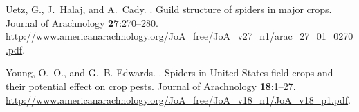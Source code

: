 \begin{thebibliography}{13}
Uetz, G., J.~Halaj, and A.~Cady.
.
\newblock Guild structure of spiders in major crops.
\newblock Journal of Arachnology {\bfseries 27}:270--280.
\newblock
  \urlprefix\url{http://www.americanarachnology.org/JoA_free/JoA_v27_n1/arac_27_01_0270.pdf}.

Young, O.~O., and G.~B. Edwards.
.
\newblock Spiders in {United} {States} field crops and their potential effect
  on crop pests.
\newblock Journal of Arachnology {\bfseries 18}:1--27.
\newblock
  \urlprefix\url{http://www.americanarachnology.org/JoA_free/JoA_v18_n1/JoA_v18_p1.pdf}.

\end{thebibliography}
